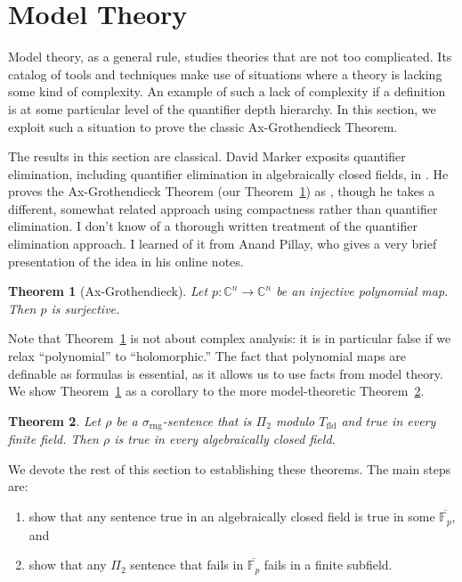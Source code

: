 \documentclass{article}
\theoremstyle{plain}
\newtheorem{thm}{Theorem}[section]
\theoremstyle{definition}
\newcommand{\ringsig}{\sigma_{\operatorname{rng}}}
\newcommand{\fieldthy}{T_{\operatorname{fld}}}
\begin{document}
\section{Model Theory}

Model theory, as a general rule, studies theories that are not too
complicated. Its catalog of tools and techniques make use of
situations where a theory is lacking some kind of complexity. An
example of such a lack of complexity if a definition is at some
particular level of the quantifier depth hierarchy. In this section,
we exploit such a situation to prove the classic Ax-Grothendieck
Theorem.

The results in this section are classical. David Marker exposits
quantifier elimination, including quantifier elimination in
algebraically closed fields, in \cite[Chapter~3]{marker}. He proves
the Ax-Grothendieck Theorem (our Theorem~\ref{thm:ax-groth}) as
\cite[Theorem~2.2.11]{marker}, though he takes a different, somewhat
related approach using compactness rather than quantifier
elimination. I don't know of a thorough written treatment of the
quantifier elimination approach. I learned of it from Anand Pillay,
who gives a very brief presentation of the idea in his online
notes\cite[Corollaries 3.8 and 3.9]{anandnotes}.

\begin{thm}[Ax-Grothendieck]\label{thm:ax-groth}
  Let $p : \mathbb{C}^n \to \mathbb{C}^n$ be an injective polynomial
  map. Then $p$ is surjective.
\end{thm}

Note that Theorem~\ref{thm:ax-groth} is not about complex analysis: it
is in particular false if we relax ``polynomial'' to ``holomorphic.''
The fact that polynomial maps are definable as formulas is essential,
as it allows us to use facts from model theory. We show
Theorem~\ref{thm:ax-groth} as a corollary to the more model-theoretic
Theorem~\ref{thm:ax-groth-modeltheory}.

\begin{thm}\label{thm:ax-groth-modeltheory}
  Let $\rho$ be a $\ringsig$-sentence that is $\Pi_2$ modulo
  $\fieldthy$ and true in every finite field. Then $\rho$ is true in
  every algebraically closed field.
\end{thm}

We devote the rest of this section to establishing these theorems. The
main steps are:
\begin{enumerate}
\item show that any sentence true in an algebraically closed field is
  true in some $\overline{\mathbb{F}_p}$, and
\item show that any $\Pi_2$ sentence that fails in
  $\overline{\mathbb{F}_p}$ fails in a finite subfield.
\end{enumerate}
\end{document}
